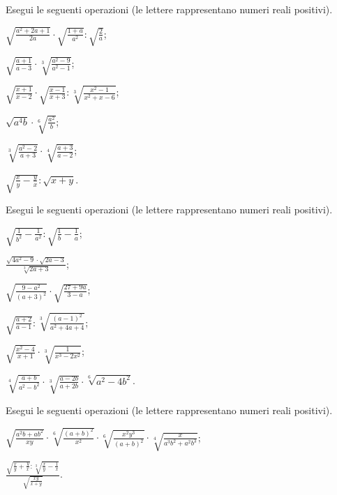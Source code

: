 \begin{esercizio}[\Ast]
 \label{ese:2.37}
Esegui le seguenti operazioni (le lettere rappresentano numeri reali positivi).
 \begin{multicols}{2}
 \begin{enumeratea}
 \item $\sqrt{\frac{a^2+2a+1}{2a}}\cdot \sqrt{\frac{1+a}{a^2}}:\sqrt{\frac 2 a}$;
 \item $\sqrt{\frac{a+1}{a-3}}\cdot \sqrt[3]{\frac{a^2-9}{a^2-1}}$;
 \item $\sqrt{\frac{x+1}{x-2}}\cdot \sqrt{\frac{x-1}{x+3}}:\sqrt[3]{\frac{x^2-1}{x^2+x-6}}$;
 \item $\sqrt{a^4b}\cdot \sqrt[6]{\frac{a^2} b}$;
 \item $\sqrt[3]{\frac{a^2-2}{a+3}}\cdot \sqrt[4]{\frac{a+3}{a-2}}$;
 \item $\sqrt{\frac x y-\frac y x}:\sqrt{x+y}$.
 \end{enumeratea}
 \end{multicols}
\end{esercizio}

\begin{esercizio}[\Ast]
 \label{ese:2.38}
Esegui le seguenti operazioni (le lettere rappresentano numeri reali positivi).
 \begin{multicols}{2}
 \begin{enumeratea}
 \item $\sqrt{\frac 1{b^2}-\frac 1{a^2}}:\sqrt{\frac 1 b-\frac 1 a}$;
 \item $\frac{\sqrt{4a^2-9}\cdot \sqrt{2a-3}}{\sqrt[3]{2a+3}}$;
 \item $\sqrt{\frac{9-a^2}{(a+3)^2}}\cdot \sqrt{\frac{27+9a}{3-a}}$;
 \item $\sqrt{\frac{a+2}{a-1}}:\sqrt[3]{\frac{(a-1)^2}{a^2+4a+4}}$;
 \item $\sqrt{\frac{x^2-4}{x+1}}\cdot \sqrt[3]{\frac 1{x^3-2x^2}}$;
 \item $\sqrt[4]{\frac{a+b}{a^2-b^2}}\cdot \sqrt[3]{\frac{a-2b}{a+2b}}\cdot \sqrt[6]{a^2-4b^2}$.
 \end{enumeratea}
 \end{multicols}
\end{esercizio}

\begin{esercizio}[\Ast]
 \label{ese:2.39}
Esegui le seguenti operazioni (le lettere rappresentano numeri reali positivi).
 \begin{enumeratea}
 \item $\sqrt{\frac{a^2b+ab^2}{xy}}\cdot \sqrt[6]{\frac{(a+b)^2}{x^2}}\cdot \sqrt[6]{\frac{x^2y^3}{(a+b)^2}}\cdot \sqrt[4]{\frac x{a^3b^2+a^2b^3}}$;
 \item $\frac{\sqrt{\frac x y+\frac y x}:\sqrt[3]{\frac x y-\frac 1 x}}{\sqrt{\frac{xy}{x+y}}}$.
 \end{enumeratea}
\end{esercizio}

